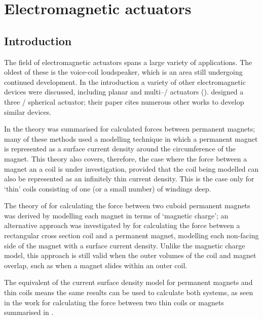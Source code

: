 \documentclass[11pt,a4paper]{memoir}
\begin{document}
\chapter{Electromagnetic actuators}


\section{Introduction}

The field of electromagnetic actuators spans a large variety of applications.
The oldest of these is the voice-coil loudspeaker, which is an area still undergoing continued development.
In the introduction a variety of other electromagnetic devices were discussed, including planar and multi--\dof/ actuators ().
\textcite{yan2008-ietmx} designed a three \dof/ spherical actuator; their paper cites numerous other works to develop similar devices.

In  the theory was summarised for calculated forces between permanent magnets; many of these methods used a modelling technique in which a permanent magnet is represented as a surface current density around the circumference of the magnet.
This theory also covers, therefore, the case where the force between a magnet an a coil is under investigation, provided that the coil being modelled can also be represented as an infinitely thin current density.
This is the case only for `thin' coils consisting of one (or a small number) of windings deep.

The theory of \textcite{akoun1984} for calculating the force between two cuboid permanent magnets was derived by modelling each magnet in terms of `magnetic charge'; an alternative approach was investigated by \textcite{rovers2010-ietm} for calculating the force between a rectangular cross section coil and a permanent magnet, modelling each non-facing side of the magnet with a surface current density.
Unlike the magnetic charge model, this approach is still valid when the outer volumes of the coil and magnet overlap, such as when a magnet slides within an outer coil.

The equivalent of the current surface density model for permanent magnets and thin coils means the same results can be used to calculate both systems, as seen in the work for calculating the force between two thin coils or magnets \cite{babic2008-ietm,ravaud2010-ietm,robertson2011-ietm} summarised in .
\end{document}

